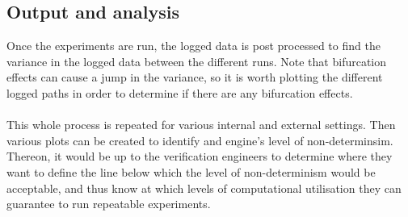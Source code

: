 \subsection{Output and analysis}
\noindent Once the experiments are run, the logged data is post processed to find the variance in the logged data between the different runs. Note that bifurcation effects can cause a jump in the variance, so it is worth plotting the different logged paths in order to determine if there are any bifurcation effects.\\\\
This whole process is repeated for various internal and external settings. 
Then various plots can be created to identify and engine's level of non-determinsim. 
Thereon, it would be up to the verification engineers to determine where they want to define the line below which the level of non-determinism would be acceptable, and thus know at which levels of computational utilisation they can guarantee to run repeatable experiments.   

